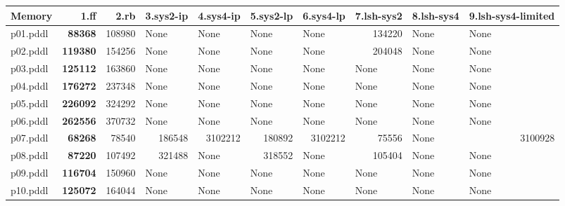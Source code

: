 \documentclass{article}
\begin{document}
\begin{tabular}{@{}lrrrrrrrrr@{}}
Memory & 1.ff & 2.rb & 3.sys2-ip & 4.sys4-ip & 5.sys2-lp & 6.sys4-lp & 7.lsh-sys2 & 8.lsh-sys4 & 9.lsh-sys4-limited \\
\midrule
p01.pddl & \textbf{88368} & 108980 & \multicolumn{1}{|l|}{None} & \multicolumn{1}{|l|}{None} & \multicolumn{1}{|l|}{None} & \multicolumn{1}{|l|}{None} & 134220 & \multicolumn{1}{|l|}{None} & \multicolumn{1}{|l|}{None} \\
p02.pddl & \textbf{119380} & 154256 & \multicolumn{1}{|l|}{None} & \multicolumn{1}{|l|}{None} & \multicolumn{1}{|l|}{None} & \multicolumn{1}{|l|}{None} & 204048 & \multicolumn{1}{|l|}{None} & \multicolumn{1}{|l|}{None} \\
p03.pddl & \textbf{125112} & 163860 & \multicolumn{1}{|l|}{None} & \multicolumn{1}{|l|}{None} & \multicolumn{1}{|l|}{None} & \multicolumn{1}{|l|}{None} & \multicolumn{1}{|l|}{None} & \multicolumn{1}{|l|}{None} & \multicolumn{1}{|l|}{None} \\
p04.pddl & \textbf{176272} & 237348 & \multicolumn{1}{|l|}{None} & \multicolumn{1}{|l|}{None} & \multicolumn{1}{|l|}{None} & \multicolumn{1}{|l|}{None} & \multicolumn{1}{|l|}{None} & \multicolumn{1}{|l|}{None} & \multicolumn{1}{|l|}{None} \\
p05.pddl & \textbf{226092} & 324292 & \multicolumn{1}{|l|}{None} & \multicolumn{1}{|l|}{None} & \multicolumn{1}{|l|}{None} & \multicolumn{1}{|l|}{None} & \multicolumn{1}{|l|}{None} & \multicolumn{1}{|l|}{None} & \multicolumn{1}{|l|}{None} \\
p06.pddl & \textbf{262556} & 370732 & \multicolumn{1}{|l|}{None} & \multicolumn{1}{|l|}{None} & \multicolumn{1}{|l|}{None} & \multicolumn{1}{|l|}{None} & \multicolumn{1}{|l|}{None} & \multicolumn{1}{|l|}{None} & \multicolumn{1}{|l|}{None} \\
p07.pddl & \textbf{68268} & 78540 & 186548 & 3102212 & 180892 & 3102212 & 75556 & \multicolumn{1}{|l|}{None} & 3100928 \\
p08.pddl & \textbf{87220} & 107492 & 321488 & \multicolumn{1}{|l|}{None} & 318552 & \multicolumn{1}{|l|}{None} & 105404 & \multicolumn{1}{|l|}{None} & \multicolumn{1}{|l|}{None} \\
p09.pddl & \textbf{116704} & 150960 & \multicolumn{1}{|l|}{None} & \multicolumn{1}{|l|}{None} & \multicolumn{1}{|l|}{None} & \multicolumn{1}{|l|}{None} & \multicolumn{1}{|l|}{None} & \multicolumn{1}{|l|}{None} & \multicolumn{1}{|l|}{None} \\
p10.pddl & \textbf{125072} & 164044 & \multicolumn{1}{|l|}{None} & \multicolumn{1}{|l|}{None} & \multicolumn{1}{|l|}{None} & \multicolumn{1}{|l|}{None} & \multicolumn{1}{|l|}{None} & \multicolumn{1}{|l|}{None} & \multicolumn{1}{|l|}{None} \\

\end{tabular}
\end{document}

